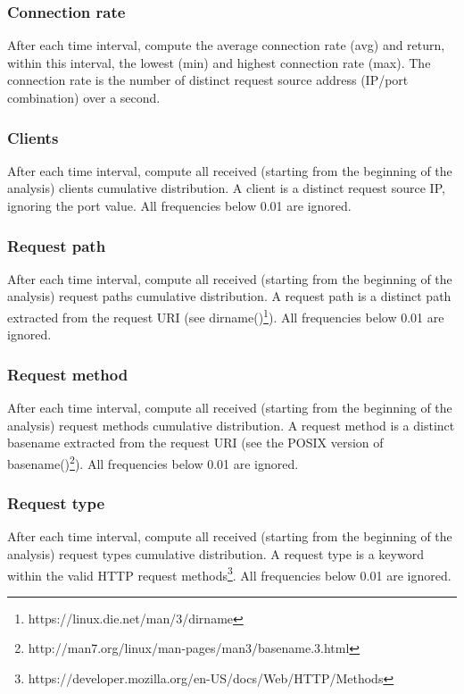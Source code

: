 \documentclass[12pt,hidelinks]{article}
\begin{document}
\subsubsection{Connection rate}
After each time interval, compute the average connection rate (avg) and return, within this interval, the lowest (min) and highest connection rate (max).
The connection rate is the number of distinct request source address (IP/port combination) over a second. 


\subsubsection{Clients}

After each time interval, compute all received (starting from the beginning of the analysis) clients cumulative distribution. 
A client is a distinct request source IP, ignoring the port value. All frequencies below 0.01 are ignored.

\subsubsection{Request path}

After each time interval, compute all received (starting from the beginning of the analysis) request paths cumulative distribution. 
A request path is a distinct path extracted from the request URI (see dirname()\footnote{https://linux.die.net/man/3/dirname}). All frequencies below 0.01 are ignored.

\subsubsection{Request method}

After each time interval, compute all received (starting from the beginning of the analysis) request methods cumulative distribution. 
A request method is a distinct basename extracted from the request URI (see the POSIX version of basename()\footnote{http://man7.org/linux/man-pages/man3/basename.3.html}). All frequencies below 0.01 are ignored.

\subsubsection{Request type}

After each time interval, compute all received (starting from the beginning of the analysis) request types cumulative distribution. 
A request type is a keyword within the valid HTTP request methods\footnote{https://developer.mozilla.org/en-US/docs/Web/HTTP/Methods}. All frequencies below 0.01 are ignored.
\end{document}
